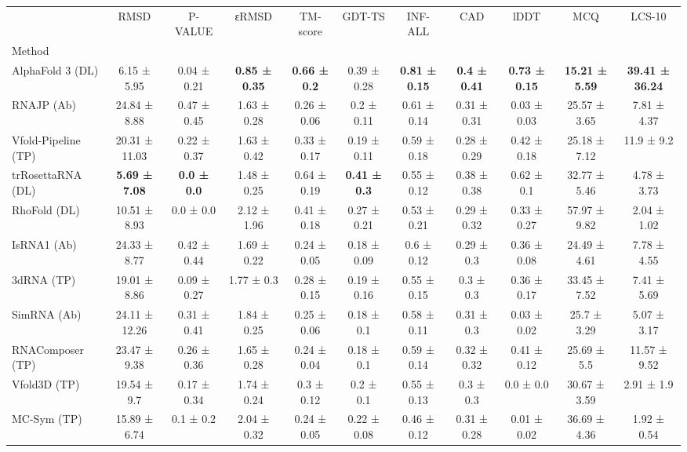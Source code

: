 \begin{tabular}{lcccccccccc}
\toprule
 & RMSD & P-VALUE & εRMSD & TM-score & GDT-TS & INF-ALL & CAD & lDDT & MCQ & LCS-10 \\
Method &  &  &  &  &  &  &  &  &  &  \\
\midrule
AlphaFold 3 (DL) & 6.15 ± 5.95 & 0.04 ± 0.21 & \textbf{0.85 ± 0.35} & \textbf{0.66 ± 0.2} & 0.39 ± 0.28 & \textbf{0.81 ± 0.15} & \textbf{0.4 ± 0.41} & \textbf{0.73 ± 0.15} & \textbf{15.21 ± 5.59} & \textbf{39.41 ± 36.24} \\
RNAJP (Ab) & 24.84 ± 8.88 & 0.47 ± 0.45 & 1.63 ± 0.28 & 0.26 ± 0.06 & 0.2 ± 0.11 & 0.61 ± 0.14 & 0.31 ± 0.31 & 0.03 ± 0.03 & 25.57 ± 3.65 & 7.81 ± 4.37 \\
Vfold-Pipeline (TP) & 20.31 ± 11.03 & 0.22 ± 0.37 & 1.63 ± 0.42 & 0.33 ± 0.17 & 0.19 ± 0.11 & 0.59 ± 0.18 & 0.28 ± 0.29 & 0.42 ± 0.18 & 25.18 ± 7.12 & 11.9 ± 9.2 \\
trRosettaRNA (DL) & \textbf{5.69 ± 7.08} & \textbf{0.0 ± 0.0} & 1.48 ± 0.25 & 0.64 ± 0.19 & \textbf{0.41 ± 0.3} & 0.55 ± 0.12 & 0.38 ± 0.38 & 0.62 ± 0.1 & 32.77 ± 5.46 & 4.78 ± 3.73 \\
RhoFold (DL) & 10.51 ± 8.93 & 0.0 ± 0.0 & 2.12 ± 1.96 & 0.41 ± 0.18 & 0.27 ± 0.21 & 0.53 ± 0.21 & 0.29 ± 0.32 & 0.33 ± 0.27 & 57.97 ± 9.82 & 2.04 ± 1.02 \\
IsRNA1 (Ab) & 24.33 ± 8.77 & 0.42 ± 0.44 & 1.69 ± 0.22 & 0.24 ± 0.05 & 0.18 ± 0.09 & 0.6 ± 0.12 & 0.29 ± 0.3 & 0.36 ± 0.08 & 24.49 ± 4.61 & 7.78 ± 4.55 \\
3dRNA (TP) & 19.01 ± 8.86 & 0.09 ± 0.27 & 1.77 ± 0.3 & 0.28 ± 0.15 & 0.19 ± 0.16 & 0.55 ± 0.15 & 0.3 ± 0.3 & 0.36 ± 0.17 & 33.45 ± 7.52 & 7.41 ± 5.69 \\
SimRNA (Ab) & 24.11 ± 12.26 & 0.31 ± 0.41 & 1.84 ± 0.25 & 0.25 ± 0.06 & 0.18 ± 0.1 & 0.58 ± 0.11 & 0.31 ± 0.3 & 0.03 ± 0.02 & 25.7 ± 3.29 & 5.07 ± 3.17 \\
RNAComposer (TP) & 23.47 ± 9.38 & 0.26 ± 0.36 & 1.65 ± 0.28 & 0.24 ± 0.04 & 0.18 ± 0.1 & 0.59 ± 0.14 & 0.32 ± 0.32 & 0.41 ± 0.12 & 25.69 ± 5.5 & 11.57 ± 9.52 \\
Vfold3D (TP) & 19.54 ± 9.7 & 0.17 ± 0.34 & 1.74 ± 0.24 & 0.3 ± 0.12 & 0.2 ± 0.1 & 0.55 ± 0.13 & 0.3 ± 0.3 & 0.0 ± 0.0 & 30.67 ± 3.59 & 2.91 ± 1.9 \\
MC-Sym (TP) & 15.89 ± 6.74 & 0.1 ± 0.2 & 2.04 ± 0.32 & 0.24 ± 0.05 & 0.22 ± 0.08 & 0.46 ± 0.12 & 0.31 ± 0.28 & 0.01 ± 0.02 & 36.69 ± 4.36 & 1.92 ± 0.54 \\
\bottomrule
\end{tabular}
